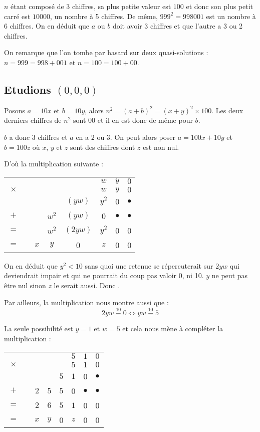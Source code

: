 \documentclass[10pt,a4paper,twocolumn]{article}
\begin{document}
$n$ étant composé de 3 chiffres, sa plus petite valeur est $100$ et donc son plus petit carré est $10000$, un nombre à 5 chiffres. De même, $999^2=998001$ est un nombre à 6 chiffres.
On en déduit que $a$ ou $b$ doit avoir 3 chiffres et que l'autre a 3 ou 2 chiffres.

On remarque que l'on tombe par hasard sur deux quasi-solutions : $n=999 = 998 + 001$ et $n=100=100 + 00$. 

\subsection{Etudions $(0,0,0)$}

Posons $a = 10x$ et $b = 10y$, alors $n^2=(a+b)^2=(x+y)^2\times 100$. Les deux derniers chiffres de $n^2$ sont 00 et il en est donc de même pour $b$.

$b$ a donc 3 chiffres et $a$ en a 2 ou 3. On peut alors poser $a=100x + 10y$ et $b=100z$ où $x$, $y$ et $z$ sont des chiffres dont $z$ est non nul.

D'où la multiplication suivante :

\begin{tabular}{cccccccc}
 & & & & & $w$ & $y$ & $0$ \\
$\times$ & & & & & $w$ & $y$ & $0$ \\
\hline
 & & & & $(yw)$ & $y^2$ & 0 & $\bullet$ \\
$+$ & & & $w^2$ & $(yw)$ & 0 & $\bullet$ & $\bullet$ \\
\hline
$=$ & & & $w^2$ & $(2yw)$ & $y^2$ & 0 & 0 \\
$=$ & & $x$ & $y$ & 0 & $z$ & 0 & 0 \\
\end{tabular}

On en déduit que $y^2 < 10$ sans quoi une retenue se répercuterait sur $2yw$ qui deviendrait impair et qui ne pourrait du coup pas valoir 0, ni 10. $y$ ne peut pas être nul sinon $z$ le serait aussi. Donc .

Par ailleurs, la multiplication nous montre aussi que : 
$$2yw \stackrel{10}\equiv 0 \iff yw \stackrel{10}\equiv 5$$

La seule possibilité est $y=1$ et $w=5$ et cela nous mène à compléter la multiplication :

\begin{tabular}{cccccccc}
 & & & & & $5$ & $1$ & $0$ \\
$\times$ & & & & & $5$ & $1$ & $0$ \\
\hline
 & & & & $5$ & $1$ & 0 & $\bullet$ \\
$+$ & & $2$ & $5$ & $5$ & 0 & $\bullet$ & $\bullet$ \\
\hline
$=$ & & $2$ & $6$ & $5$ & $1$ & 0 & 0 \\
$=$ & & $x$ & $y$ & 0 & $z$ & 0 & 0 \\
\end{tabular}
\end{document}
